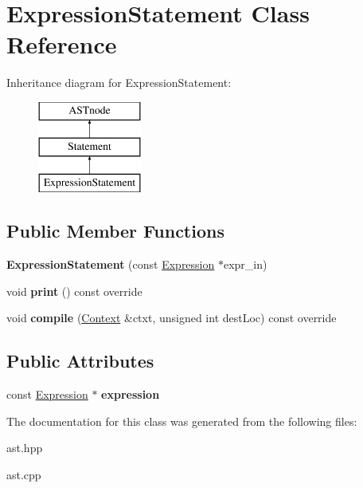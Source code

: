 \hypertarget{class_expression_statement}{}\section{Expression\+Statement Class Reference}
\label{class_expression_statement}
Inheritance diagram for Expression\+Statement\+:\begin{figure}[H]
\begin{center}
\leavevmode
\includegraphics[height=3.000000cm]{class_expression_statement}
\end{center}
\end{figure}
\subsection*{Public Member Functions}
\begin{DoxyCompactItemize}
\item 
\mbox{\label{class_expression_statement_a059afaa2d2b18fc3ce504637436f1fa2}} 
{\bfseries Expression\+Statement} (const \hyperlink{class_expression}{Expression} $\ast$expr\+\_\+in)
\item 
\mbox{\label{class_expression_statement_a1b2b835d8b55c0fe7ed5c36a91ac0e38}} 
void {\bfseries print} () const override
\item 
\mbox{\label{class_expression_statement_aefe0183e77528168ce58575d0ddf3bc2}} 
void {\bfseries compile} (\hyperlink{class_context}{Context} \&ctxt, unsigned int dest\+Loc) const override
\end{DoxyCompactItemize}
\subsection*{Public Attributes}
\begin{DoxyCompactItemize}
\item 
\mbox{\label{class_expression_statement_a30a0a5bbd251c79a62708ca201874738}} 
const \hyperlink{class_expression}{Expression} $\ast$ {\bfseries expression}
\end{DoxyCompactItemize}


The documentation for this class was generated from the following files\+:\begin{DoxyCompactItemize}
\item 
ast.\+hpp\item 
ast.\+cpp\end{DoxyCompactItemize}

